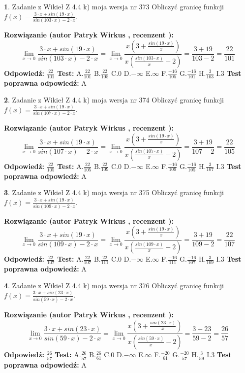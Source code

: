\documentclass[12pt, a4paper]{article}
\theoremstyle{definition} %
\newtheorem{zad}{}
\newcommand{\zadStart}[1]{\begin{zad}#1\newline}
\newcommand{\zadStop}{\end{zad}}
\newcommand{\rozwStart}[2]{\noindent \textbf{Rozwiązanie (autor #1 , recenzent #2): }\newline}
\newcommand{\rozwStop}{\newline}
\newcommand{\odpStart}{\noindent \textbf{Odpowiedź:}\newline}
\newcommand{\odpStop}{\newline}
\newcommand{\testStart}{\noindent \textbf{Test:}\newline}
\newcommand{\testStop}{\newline}
\newcommand{\kluczStart}{\noindent \textbf{Test poprawna odpowiedź:}\newline}
\newcommand{\kluczStop}{\newline}
\begin{document}
\zadStart{Zadanie z Wikieł Z 4.4 k) moja wersja nr 373}
Obliczyć granicę funkcji $f(x)=\frac{3\cdot x +sin(19\cdot x)}{sin(103\cdot x) -2\cdot x}$.
\zadStop
\rozwStart{Patryk Wirkus}{}
$$\lim\limits_{x\to 0}\frac{3\cdot x +sin(19\cdot x)}{sin(103\cdot x) -2\cdot x}
=\lim\limits_{x\to 0}\frac{x(3+\frac{sin(19\cdot x)}{x})}{x(\frac{sin(103\cdot x)}{x}-2)}
=\frac{3+19}{103-2} = \frac{22}{101}$$
\rozwStop
\odpStart
$\frac{22}{101}$
\odpStop
\testStart
A.$\frac{22}{101}$
B.$\frac{22}{105}$
C.$0$
D.$-\infty$
E.$\infty$
F.$\frac{-16}{105}$
G.$\frac{-16}{101}$
H.$\frac{3}{103}$
I.$3$
\testStop
\kluczStart
A
\kluczStop



\zadStart{Zadanie z Wikieł Z 4.4 k) moja wersja nr 374}
Obliczyć granicę funkcji $f(x)=\frac{3\cdot x +sin(19\cdot x)}{sin(107\cdot x) -2\cdot x}$.
\zadStop
\rozwStart{Patryk Wirkus}{}
$$\lim\limits_{x\to 0}\frac{3\cdot x +sin(19\cdot x)}{sin(107\cdot x) -2\cdot x}
=\lim\limits_{x\to 0}\frac{x(3+\frac{sin(19\cdot x)}{x})}{x(\frac{sin(107\cdot x)}{x}-2)}
=\frac{3+19}{107-2} = \frac{22}{105}$$
\rozwStop
\odpStart
$\frac{22}{105}$
\odpStop
\testStart
A.$\frac{22}{105}$
B.$\frac{22}{109}$
C.$0$
D.$-\infty$
E.$\infty$
F.$\frac{-16}{109}$
G.$\frac{-16}{105}$
H.$\frac{3}{107}$
I.$3$
\testStop
\kluczStart
A
\kluczStop



\zadStart{Zadanie z Wikieł Z 4.4 k) moja wersja nr 375}
Obliczyć granicę funkcji $f(x)=\frac{3\cdot x +sin(19\cdot x)}{sin(109\cdot x) -2\cdot x}$.
\zadStop
\rozwStart{Patryk Wirkus}{}
$$\lim\limits_{x\to 0}\frac{3\cdot x +sin(19\cdot x)}{sin(109\cdot x) -2\cdot x}
=\lim\limits_{x\to 0}\frac{x(3+\frac{sin(19\cdot x)}{x})}{x(\frac{sin(109\cdot x)}{x}-2)}
=\frac{3+19}{109-2} = \frac{22}{107}$$
\rozwStop
\odpStart
$\frac{22}{107}$
\odpStop
\testStart
A.$\frac{22}{107}$
B.$\frac{22}{111}$
C.$0$
D.$-\infty$
E.$\infty$
F.$\frac{-16}{111}$
G.$\frac{-16}{107}$
H.$\frac{3}{109}$
I.$3$
\testStop
\kluczStart
A
\kluczStop



\zadStart{Zadanie z Wikieł Z 4.4 k) moja wersja nr 376}
Obliczyć granicę funkcji $f(x)=\frac{3\cdot x +sin(23\cdot x)}{sin(59\cdot x) -2\cdot x}$.
\zadStop
\rozwStart{Patryk Wirkus}{}
$$\lim\limits_{x\to 0}\frac{3\cdot x +sin(23\cdot x)}{sin(59\cdot x) -2\cdot x}
=\lim\limits_{x\to 0}\frac{x(3+\frac{sin(23\cdot x)}{x})}{x(\frac{sin(59\cdot x)}{x}-2)}
=\frac{3+23}{59-2} = \frac{26}{57}$$
\rozwStop
\odpStart
$\frac{26}{57}$
\odpStop
\testStart
A.$\frac{26}{57}$
B.$\frac{26}{61}$
C.$0$
D.$-\infty$
E.$\infty$
F.$\frac{-20}{61}$
G.$\frac{-20}{57}$
H.$\frac{3}{59}$
I.$3$
\testStop
\kluczStart
A
\kluczStop
\end{document}
